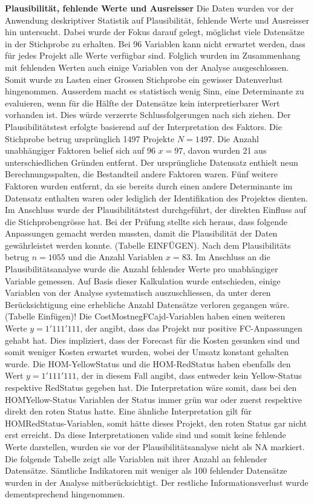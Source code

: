\newline
\newline\textbf{Plausibilität, fehlende Werte und Ausreisser}
\newline	Die Daten wurden vor der Anwendung deskriptiver Statistik auf Plausibilität, fehlende Werte und Ausreisser hin untersucht. Dabei wurde der Fokus darauf gelegt, möglichst viele Datensätze in der Stichprobe zu erhalten. Bei 96 Variablen kann nicht erwartet werden, dass für jedes Projekt alle Werte verfügbar sind. Folglich wurden im Zusammenhang mit fehlenden Werten auch einige Variablen von der Analyse ausgeschlossen. Somit wurde zu Lasten einer Grossen Stichprobe ein gewisser Datenverlust hingenommen. Ausserdem macht es statistisch wenig Sinn, eine Determinante zu evaluieren, wenn für die Hälfte der Datensätze kein interpretierbarer Wert vorhanden ist. Dies würde verzerrte Schlussfolgerungen nach sich ziehen.
\newline Der Plausibilitätstest erfolgte basierend auf der Interpretation des Faktors. Die Stichprobe betrug ursprünglich 1497 Projekte $N = 1497$. Die Anzahl unabhängiger Faktoren belief sich auf 96 $x = 97$, davon wurden 21 aus unterschiedlichen Gründen entfernt. Der ursprüngliche Datensatz enthielt neun Berechnungsspalten, die Bestandteil andere Faktoren waren. Fünf weitere Faktoren wurden entfernt, da sie bereits durch einen andere Determinante im Datensatz enthalten waren oder lediglich der Identifikation des Projektes dienten. Im Anschluss wurde der Plausibilitätstest durchgeführt, der direkten Einfluss auf die Stichprobengrösse hat. Bei der Prüfung stellte sich heraus, dass folgende Anpassungen gemacht werden mussten, damit die Plausibilität der Daten gewährleistet werden konnte. (Tabelle EINFÜGEN).
\newline Nach dem Plausibilitäts betrug $n = 1055$ und die Anzahl Variablen $x = 83$. Im Anschluss an die Plausibilitätsanalyse wurde die Anzahl fehlender Werte pro unabhängiger Variable gemessen. Auf Basis dieser Kalkulation wurde entschieden, einige Variablen von der Analyse systematisch auszuschliessen, da unter deren Berücksichtigung eine erhebliche Anzahl Datensätze verloren gegangen wäre. (Tabelle Einfügen)! Die CostMostnegFCajd-Variablen haben einen weiteren Werte $y = 1'111'111$, der angibt, dass das Projekt nur positive FC-Anpassungen gehabt hat. Dies impliziert, dass der Forecast für die Kosten gesunken sind und somit weniger Kosten erwartet wurden, wobei der Umsatz konstant gehalten wurde. Die HOM-YellowStatus und die HOM-RedStatus haben ebenfalls den Wert $y = 1'111'111$, der in diesem Fall angibt, dass entweder kein Yellow-Status respektive RedStatus gegeben hat. Die Interpretation wäre somit, dass bei den HOMYellow-Status Variablen der Status immer grün war oder zuerst respektive direkt den roten Status hatte. Eine ähnliche Interpretation gilt für HOMRedStatus-Variablen, somit hätte dieses Projekt, den roten Status gar nicht erst erreicht. Da diese Interpretationen valide sind und somit keine fehlende Werte darstellen, wurden sie vor der Plausibilitätsanalyse nicht als NA markiert. Die folgende Tabelle zeigt alle Variablen mit ihrer Anzahl an fehlender Datensätze. Sämtliche Indikatoren mit weniger als 100 fehlender Datensätze wurden in der Analyse mitberücksichtigt. Der restliche Informationsverlust wurde dementsprechend hingenommen. 
